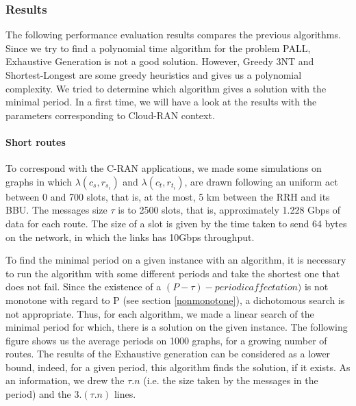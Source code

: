 \documentclass[a4paper,10pt]{article}
\begin{document}
      


    \subsubsection{Results}
      The following performance evaluation results compares the previous algorithms. Since we try to find a polynomial time algorithm for the problem PALL, Exhaustive Generation is not a good solution. However, Greedy 3NT and Shortest-Longest are some greedy heuristics and gives us a polynomial complexity. We tried to determine which algorithm gives a solution with the minimal period.
      In a first time, we will have a look at the results with the parameters corresponding to Cloud-RAN context.
      \paragraph{Short routes}
      To correspond with the C-RAN applications, we made some simulations on graphs in which $\lambda(c_s,r_{s_i})$ and $\lambda(c_t,r_{t_i})$, are drawn following an uniform act between 0 and 700 slots, that is, at the most, 5 km between the RRH and its BBU. The messages size $\tau$ is to 2500 slots, that is, approximately 1.228 Gbps of data for each route. The size of a slot is given by the time taken to send 64 bytes on the network, in which the links has 10Gbps throughput.
      
      To find the minimal period on a given instance with an algorithm, it is necessary to run the algorithm with some different periods and take the shortest one that does not fail. Since the existence of a $(P-\tau)-periodic affectation)$ is not monotone with regard to P (see section \ref{nonmonotone}), a dichotomous search is not appropriate. Thus, for each algorithm, we made a linear search of the minimal period for which, there is a solution on the given instance. The following figure shows us the average periods on 1000 graphs, for a growing number of routes.
      The results of the Exhaustive generation can be considered as a lower bound, indeed, for a given period, this algorithm finds the solution, if it exists.
      As an information, we drew the $\tau.n$ (i.e. the size taken by the messages in the period) and the $3.(\tau.n) $ lines.
      
\end{document}
